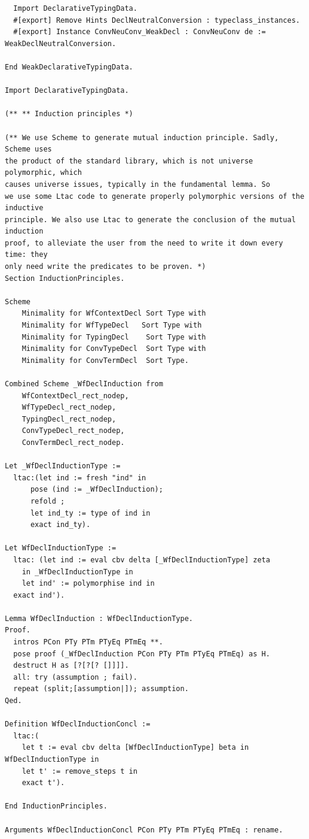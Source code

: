 \documentclass[10pt,a4paper]{amsart}
\begin{document}
\begin{lstlisting}
  Import DeclarativeTypingData.
  #[export] Remove Hints DeclNeutralConversion : typeclass_instances.
  #[export] Instance ConvNeuConv_WeakDecl : ConvNeuConv de := WeakDeclNeutralConversion.

End WeakDeclarativeTypingData.

Import DeclarativeTypingData.

(** ** Induction principles *)

(** We use Scheme to generate mutual induction principle. Sadly, Scheme uses
the product of the standard library, which is not universe polymorphic, which
causes universe issues, typically in the fundamental lemma. So
we use some Ltac code to generate properly polymorphic versions of the inductive
principle. We also use Ltac to generate the conclusion of the mutual induction
proof, to alleviate the user from the need to write it down every time: they
only need write the predicates to be proven. *)
Section InductionPrinciples.

Scheme 
    Minimality for WfContextDecl Sort Type with
    Minimality for WfTypeDecl   Sort Type with
    Minimality for TypingDecl    Sort Type with
    Minimality for ConvTypeDecl  Sort Type with
    Minimality for ConvTermDecl  Sort Type.

Combined Scheme _WfDeclInduction from
    WfContextDecl_rect_nodep,
    WfTypeDecl_rect_nodep,
    TypingDecl_rect_nodep,
    ConvTypeDecl_rect_nodep,
    ConvTermDecl_rect_nodep.

Let _WfDeclInductionType :=
  ltac:(let ind := fresh "ind" in
      pose (ind := _WfDeclInduction);
      refold ;
      let ind_ty := type of ind in
      exact ind_ty).

Let WfDeclInductionType :=
  ltac: (let ind := eval cbv delta [_WfDeclInductionType] zeta
    in _WfDeclInductionType in
    let ind' := polymorphise ind in
  exact ind').

Lemma WfDeclInduction : WfDeclInductionType.
Proof.
  intros PCon PTy PTm PTyEq PTmEq **.
  pose proof (_WfDeclInduction PCon PTy PTm PTyEq PTmEq) as H.
  destruct H as [?[?[? []]]].
  all: try (assumption ; fail).
  repeat (split;[assumption|]); assumption.
Qed.

Definition WfDeclInductionConcl :=
  ltac:(
    let t := eval cbv delta [WfDeclInductionType] beta in WfDeclInductionType in
    let t' := remove_steps t in
    exact t').

End InductionPrinciples.

Arguments WfDeclInductionConcl PCon PTy PTm PTyEq PTmEq : rename.


\end{lstlisting}
\end{document}
